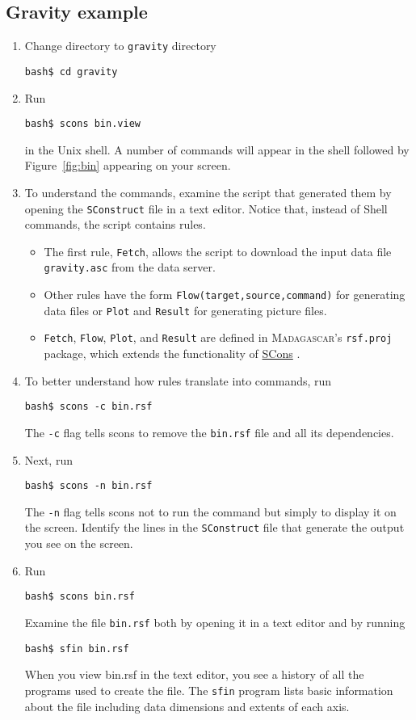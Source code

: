\subsection{Gravity example}
\begin{enumerate}
\item Change directory to \texttt{gravity} directory
\begin{verbatim}
bash$ cd gravity
\end{verbatim}
\item Run
\begin{verbatim}
bash$ scons bin.view
\end{verbatim}

in the Unix shell. A number of commands will appear in the shell
followed by Figure~\ref{fig:bin} appearing on your screen.
\item To understand the commands, examine the script that generated them by 
opening the \texttt{SConstruct} file in a text editor. Notice that,
instead of Shell commands, the script contains rules.
\begin{itemize}
\item The first rule, \texttt{Fetch}, allows the script to download the 
input data file \texttt{gravity.asc} from the data server.
\item Other rules have the form \texttt{Flow(target,source,command)} for
generating data files or \texttt{Plot} and \texttt{Result} for
generating picture files.
\item \texttt{Fetch}, \texttt{Flow}, \texttt{Plot}, and \texttt{Result} 
are defined in \textsc{Madagascar}'s \texttt{rsf.proj} package, which
extends the functionality of \href{http://www.scons.org}{SCons} .
\end{itemize}
\item To better understand how rules translate into commands, run 
\begin{verbatim}
bash$ scons -c bin.rsf
\end{verbatim}
The \texttt{-c} flag tells scons to remove the \texttt{bin.rsf} file
and all its dependencies.
\item Next, run
\begin{verbatim}
bash$ scons -n bin.rsf
\end{verbatim}
The \texttt{-n} flag tells scons not to run the command but simply to
display it on the screen. Identify the lines in
the \texttt{SConstruct} file that generate the output you see on the
screen.
\item Run
\begin{verbatim}
bash$ scons bin.rsf
\end{verbatim}
  Examine the file \texttt{bin.rsf} both by opening it in a text
  editor and by running
\begin{verbatim}
bash$ sfin bin.rsf
\end{verbatim}

  When you view bin.rsf in the text editor, you see a history of all
  the programs used to create the file. The \texttt{sfin} program
  lists basic information about the file including data dimensions and
  extents of each axis.
\end{enumerate}

